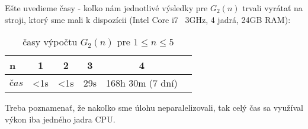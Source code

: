 Ešte uvedieme časy - koľko nám jednotlivé výsledky pre $G_2(n)$ trvali vyrátať na stroji, ktorý sme mali k dispozícii (Intel Core i7 ~3GHz, 4 jadrá, 24GB RAM):

\begin{table}[H]
  \centering
  \begin{tabular}{|l|c|c|c|c|r|}
    \hline
    n & 1 & 2 & 3 & 4 \\ 
    \hline
    $čas$ & <1s & <1s & 29s & 168h 30m (7 dní) \\ 
    \hline
  \end{tabular}
  \caption{časy výpočtu $G_2(n)$ pre $1 \leq n \leq 5$}
  \label{tab:G1n}
\end{table}

Treba poznamenať, že nakoľko sme úlohu neparalelizovali, tak celý čas sa využíval výkon iba jedného jadra CPU.
